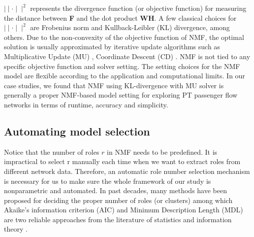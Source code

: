 \documentclass[a4paper,fleqn]{cas-sc}
\begin{document}
$\mid\mid\cdot\mid\mid^{2}$ represents the divergence function (or objective function) for measuring the distance between \textbf{F} and the dot product \textbf{WH}. A few classical choices for $\mid\mid\cdot\mid\mid^{2}$ are Frobenius norm and Kullback-Leibler (KL) divergence, among others. Due to the non-convexity of the objective function of NMF, the optimal solution is usually approximated by iterative update algorithms such as Multiplicative Update (MU) \citep{lee1999learning}, Coordinate Descent (CD) \citep{wright2015coordinate}. NMF is not tied to any specific objective function and solver setting. The setting choices for the NMF model are flexible according to the application and computational limits. In our case studies, we found that NMF using KL-divergence with MU solver is generally a proper NMF-based model setting for exploring PT passenger flow networks in terms of runtime, accuracy and simplicity.

\subsection{Automating model selection}
Notice that the number of roles $r$ in NMF needs to be predefined. It is impractical to select r manually each time when we want to extract roles from different network data. Therefore, an automatic role number selection mechanism is necessary for us to make sure the whole framework of our study is nonparametric and automated. In past decades, many methods have been proposed for deciding the proper number of roles (or clusters) among which Akaike's information criterion (AIC) and Minimum Description Length (MDL) are two reliable approaches from the literature of statistics and information theory \citep{akaike1974new, rissanen1978modeling, cook2007graph, grunwald2007minimum, rossi2014role}. 
\end{document}
